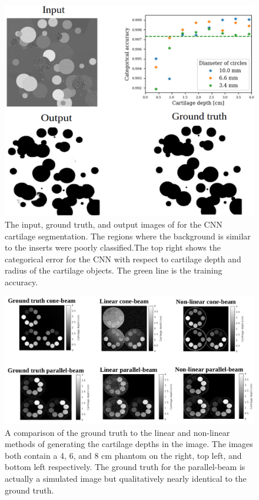 \documentclass[a4paper,11pt]{article}
\begin{document}
\begin{figure}[htbp]

\includegraphics[width=\textwidth]{figures/CNN_1.png}

\caption{The input, ground truth, and output images of for the CNN cartilage segmentation. The regions where the background is similar to the inserts were poorly classified.The top right shows the categorical error for the CNN with respect to cartilage depth and radius of the cartilage objects. The green line is the training accuracy.}
\label{figcali}
\end{figure}

\begin{figure}[htbp]
\includegraphics[width=\textwidth]{figures/comparisons_1.png}
\caption{A comparison of the ground truth to the linear and non-linear methods of generating the cartilage depths in the image. The images both contain a 4, 6, and 8 cm phantom on the right, top left, and bottom left respectively. The ground truth for the parallel-beam is actually a simulated image but qualitatively nearly identical to the ground truth.}
\label{figqual}
\qquad
\end{figure}
\end{document}

